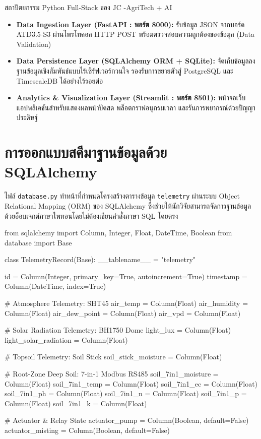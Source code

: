 \begin{agribox}{สถาปัตยกรรม Python Full-Stack ของ JC -AgriTech + AI}
    \begin{itemize}
        \item \textbf{Data Ingestion Layer (FastAPI : พอร์ต 8000):} รับข้อมูล JSON จากบอร์ด ATD3.5-S3 ผ่านโพรโทคอล HTTP POST พร้อมตรวจสอบความถูกต้องของข้อมูล (Data Validation)
        \item \textbf{Data Persistence Layer (SQLAlchemy ORM + SQLite):} จัดเก็บข้อมูลลงฐานข้อมูลเชิงสัมพันธ์แบบไร้เซิร์ฟเวอร์กวนใจ รองรับการขยายตัวสู่ PostgreSQL และ TimescaleDB ได้อย่างไร้รอยต่อ
        \item \textbf{Analytics \& Visualization Layer (Streamlit : พอร์ต 8501):} หน้าจอเว็บแอปพลิเคชันสำหรับแสดงผลหน้าปัดสด พล็อตกราฟอนุกรมเวลา และรันการพยากรณ์ด้วยปัญญาประดิษฐ์
    \end{itemize}
\end{agribox}

\section{การออกแบบสคีมาฐานข้อมูลด้วย SQLAlchemy}

ไฟล์ \texttt{database.py} ทำหน้าที่กำหนดโครงสร้างตารางข้อมูล \texttt{telemetry} ผ่านระบบ Object Relational Mapping (ORM) ของ SQLAlchemy ซึ่งช่วยให้นักวิจัยสามารถจัดการฐานข้อมูลด้วยอ็อบเจกต์ภาษาไพทอนโดยไม่ต้องเขียนคำสั่งภาษา SQL โดยตรง

\begin{pythonbox}
from sqlalchemy import Column, Integer, Float, DateTime, Boolean
from database import Base

class TelemetryRecord(Base):
    __tablename__ = "telemetry"

    id = Column(Integer, primary_key=True, autoincrement=True)
    timestamp = Column(DateTime, index=True)
    
    # Atmosphere Telemetry: SHT45
    air_temp = Column(Float)
    air_humidity = Column(Float)
    air_dew_point = Column(Float)
    air_vpd = Column(Float)
    
    # Solar Radiation Telemetry: BH1750 Dome
    light_lux = Column(Float)
    light_solar_radiation = Column(Float)
    
    # Topsoil Telemetry: Soil Stick
    soil_stick_moisture = Column(Float)
    
    # Root-Zone Deep Soil: 7-in-1 Modbus RS485
    soil_7in1_moisture = Column(Float)
    soil_7in1_temp = Column(Float)
    soil_7in1_ec = Column(Float)
    soil_7in1_ph = Column(Float)
    soil_7in1_n = Column(Float)
    soil_7in1_p = Column(Float)
    soil_7in1_k = Column(Float)
    
    # Actuator & Relay State
    actuator_pump = Column(Boolean, default=False)
    actuator_misting = Column(Boolean, default=False)
\end{pythonbox}

